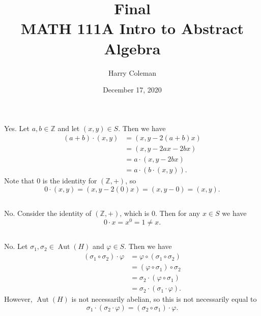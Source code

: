 \documentclass[12pt]{article}
\newcommand{\Z}{\mathbb{Z}}
\renewcommand{\phi}{\varphi}
\newcommand{\Aut}{\operatorname{Aut}}
\newcommand{\<}{\left\langle}
\renewcommand{\>}{\right\rangle}
\begin{document}
 
\title{Final\\
    \large MATH 111A Intro to Abstract Algebra
}
\author{Harry Coleman}
\date{December 17, 2020}
\maketitle

\section{}
\subsection{}
Yes. Let $a, b \in \Z$ and let $(x, y) \in S$. Then we have
\begin{align*}
    (a + b) \cdot (x, y) 
        &= (x, y - 2(a + b)x) \\
        &= (x, y - 2ax - 2bx) \\
        &= a \cdot (x, y - 2bx) \\
        &= a \cdot (b \cdot (x, y)).
\end{align*}
Note that $0$ is the identity for $(\Z, +)$, so
\[
    0 \cdot (x, y) = (x, y - 2(0)x) = (x, y - 0) = (x, y).
\]

\subsection{}
No. Consider the identity of $(\Z, +)$, which is $0$. Then for any $x \in S$ we have
\[
    0 \cdot x = x^0 = 1 \ne x.
\]

\newpage
\subsection{}
No. Let $\sigma_1, \sigma_2 \in \Aut(H)$ and $\phi \in S$. Then we have
\begin{align*}
    (\sigma_1 \circ \sigma_2) \cdot \phi
        &= \phi \circ (\sigma_1 \circ \sigma_2) \\
        &= (\phi \circ \sigma_1) \circ \sigma_2 \\
        &= \sigma_2 \cdot (\phi \circ \sigma_1) \\
        &= \sigma_2 \cdot (\sigma_1 \cdot \phi).
\end{align*}
However, $\Aut(H)$ is not necessarily abelian, so this is not necessarily equal to
\[
    \sigma_1 \cdot ( \sigma_2 \cdot \phi) = (\sigma_2 \circ \sigma_1) \cdot \phi.
\]

\newpage
\end{document}
